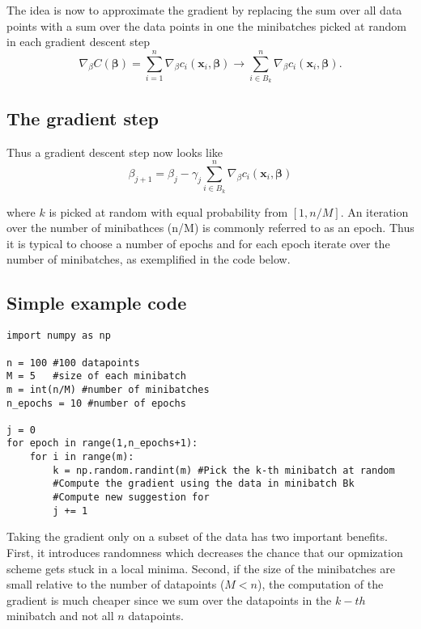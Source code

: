 \documentclass[%
oneside,                 %
final,                   %
10pt]{article}
\begin{document}
The idea is now to approximate the gradient by replacing the sum over
all data points with a sum over the data points in one the minibatches
picked at random in each gradient descent step 
\[
\nabla_{\beta}
C(\mathbf{\beta}) = \sum_{i=1}^n \nabla_\beta c_i(\mathbf{x}_i,
\mathbf{\beta}) \rightarrow \sum_{i \in B_k}^n \nabla_\beta
c_i(\mathbf{x}_i, \mathbf{\beta}).
\]

\subsection*{The gradient step}

Thus a gradient descent step now looks like 
\[
\beta_{j+1} = \beta_j - \gamma_j \sum_{i \in B_k}^n \nabla_\beta c_i(\mathbf{x}_i,
\mathbf{\beta})
\]

where $k$ is picked at random with equal
probability from $[1,n/M]$. An iteration over the number of
minibathces (n/M) is commonly referred to as an epoch. Thus it is
typical to choose a number of epochs and for each epoch iterate over
the number of minibatches, as exemplified in the code below.

\subsection*{Simple example code}
















\begin{verbatim}
import numpy as np 

n = 100 #100 datapoints 
M = 5   #size of each minibatch
m = int(n/M) #number of minibatches
n_epochs = 10 #number of epochs

j = 0
for epoch in range(1,n_epochs+1):
    for i in range(m):
        k = np.random.randint(m) #Pick the k-th minibatch at random
        #Compute the gradient using the data in minibatch Bk
        #Compute new suggestion for 
        j += 1

\end{verbatim}


Taking the gradient only on a subset of the data has two important
benefits. First, it introduces randomness which decreases the chance
that our opmization scheme gets stuck in a local minima. Second, if
the size of the minibatches are small relative to the number of
datapoints ($M <  n$), the computation of the gradient is much
cheaper since we sum over the datapoints in the $k-th$ minibatch and not
all $n$ datapoints.
\end{document}
